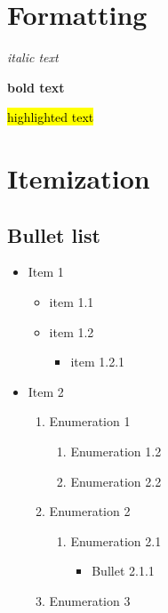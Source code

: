 \documentclass{doc_class_fontsize}{extarticle}
\begin{document}


\section{Formatting}




\textit{italic text}

\textbf{bold text}

\hl{highlighted text}





\section{Itemization}

\subsection{Bullet list}

\begin{itemize}
\item Item 1
\begin{itemize}
\item item 1.1
\item item 1.2
\begin{itemize}
\item item 1.2.1
\end{itemize}
\end{itemize}
\item Item 2
\begin{enumerate}
\item Enumeration 1
\begin{enumerate}
\item Enumeration 1.2
\item Enumeration 2.2
\end{enumerate}
\item Enumeration 2
\begin{enumerate}
\item Enumeration 2.1
\begin{itemize}
\item Bullet 2.1.1
\end{itemize}
\end{enumerate}
\item Enumeration 3
\end{enumerate}
\end{itemize}
\end{document}
